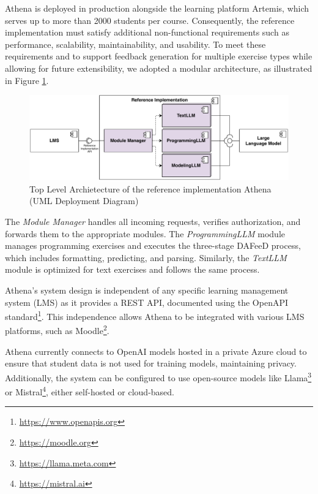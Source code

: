 \documentclass[manuscript,screen,review]{acmart}
\begin{document}
Athena is deployed in production alongside the learning platform Artemis, which serves up to more than 2000 students per course.
Consequently, the reference implementation must satisfy additional non-functional requirements such as performance, scalability, maintainability, and usability.
To meet these requirements and to support feedback generation for multiple exercise types while allowing for future extensibility, we adopted a modular architecture, as illustrated in Figure \ref{fig:Athena-architecture}.

\begin{figure}[htbp]
  \centering
  \includegraphics[width=\linewidth]{figures/Athena-Architecture.pdf}
  \caption{Top Level Archietecture of the reference implementation Athena (UML Deployment Diagram)}
  \label{fig:Athena-architecture}
\end{figure}

The \textit{Module Manager} handles all incoming requests, verifies authorization, and forwards them to the appropriate modules.
The \textit{ProgrammingLLM} module manages programming exercises and executes the three-stage DAFeeD process, which includes formatting, predicting, and parsing. 
Similarly, the \textit{TextLLM} module is optimized for text exercises and follows the same process.

Athena's system design is independent of any specific learning management system (LMS) as it provides a REST API, documented using the OpenAPI standard\footnote{\url{https://www.openapis.org}}.
This independence allows Athena to be integrated with various LMS platforms, such as Moodle\footnote{\url{https://moodle.org}}.

Athena currently connects to OpenAI models hosted in a private Azure cloud to ensure that student data is not used for training models, maintaining privacy.
Additionally, the system can be configured to use open-source models like Llama\footnote{\url{https://llama.meta.com}} or Mistral\footnote{\url{https://mistral.ai}}, either self-hosted or cloud-based.
\end{document}
